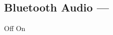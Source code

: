 \subsection[Bluetooth Audio]{Bluetooth Audio --- \UiKey{\SET}}









































Off
On

